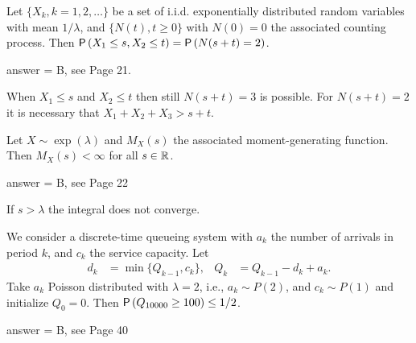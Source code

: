\begin{exercise}[201903]
Let $\{X_k, k=1, 2, \ldots\}$ be a set of i.i.d. exponentially distributed random variables with mean $1/\lambda$, and $\{N(t), t\geq 0\}$ with  $N(0)=0$ the associated counting process. Then $\P{X_1\leq s, X_2 \leq t} = \P{N(s+t) = 2}$. 
\begin{solution}
  answer = B, see Page 21.

  When $X_1\leq s$ and $X_2\leq t$ then still $N(s+t)=3$ is possible. For $N(s+t)=2$ it is  necessary that $X_1+X_2 + X_3 > s+t$. 
\end{solution}
\end{exercise}

\begin{exercise}[201903]
Let $X\sim\exp(\lambda)$ and $M_X(s)$ the associated moment-generating function. Then $M_X(s)<\infty$ for all $s\in \mathbb{R}$. 
\begin{solution}
  answer = B, see Page 22

  If $s>\lambda$ the integral does not converge. 
\end{solution}
\end{exercise}

\begin{exercise}[201903]
We consider a discrete-time queueing system with $a_k$ the number of arrivals in period $k$, and $c_k$ the service capacity. Let
\begin{align}
d_k &= \min\{Q_{k-1}, c_k\},  & Q_k &= Q_{k-1} -d_k + a_k.
\end{align}
Take $a_k$ Poisson distributed with $\lambda=2$, i.e., $a_k \sim P(2)$, and $c_k\sim P(1)$ and initialize $Q_0 = 0$. Then $\P{Q_{10000} \geq 100} \leq 1/2$. 
\begin{solution}
answer = B, see Page 40
\end{solution}
\end{exercise}

